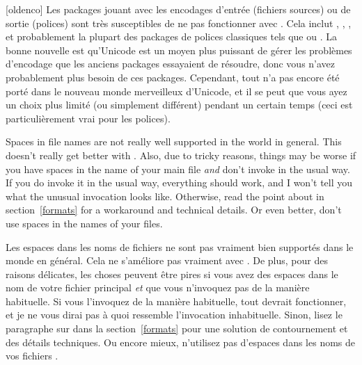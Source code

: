 \documentclass{lltxdoc}
\begin{document}
[oldenco] Les packages jouant avec les encodages d'entrée (fichiers sources) ou de sortie (polices) sont très susceptibles de ne pas fonctionner avec \luatex. Cela inclut , , , et probablement la plupart des packages de polices classiques tels que  ou . La bonne nouvelle est qu'Unicode est un moyen plus puissant de gérer les problèmes d'encodage que les anciens packages essayaient de résoudre, donc vous n'avez probablement plus besoin de ces packages. Cependant, tout n'a pas encore été porté dans le nouveau monde merveilleux d'Unicode, et il se peut que vous ayez un choix plus limité (ou simplement différent) pendant un certain temps (ceci est particulièrement vrai pour les polices).

 Spaces in file names are not really well supported in the \tex
world in general. This doesn't really get better with \luatex. Also, due to
tricky reasons, things may be worse if you have spaces in the name of your main
\tex file \emph{and} don't invoke \luatex in the usual way. If you do
invoke it in the usual way, everything should work, and I won't tell you what
the unusual invocation looks like. Otherwise, read the point about
 in section~\ref{formats} for a workaround and technical
details. Or even better, don't use spaces in the names of your \tex files.

 Les espaces dans les noms de fichiers ne sont pas vraiment bien supportés dans le monde \tex en général. Cela ne s'améliore pas vraiment avec \luatex. De plus, pour des raisons délicates, les choses peuvent être pires si vous avez des espaces dans le nom de votre fichier \tex principal \emph{et} que vous n'invoquez pas \luatex de la manière habituelle. Si vous l'invoquez de la manière habituelle, tout devrait fonctionner, et je ne vous dirai pas à quoi ressemble l'invocation inhabituelle. Sinon, lisez le paragraphe sur  dans la section~\ref{formats} pour une solution de contournement et des détails techniques. Ou encore mieux, n'utilisez pas d'espaces dans les noms de vos fichiers \tex.
\end{document}
